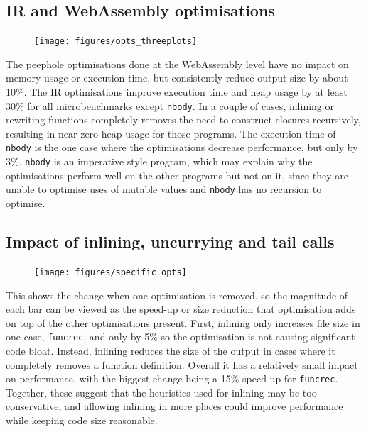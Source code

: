 \subsection{IR and WebAssembly optimisations}

\begin{figure}[H]
\hspace{-1cm}\vspace{-0.6cm}
\texttt{[image: figures/opts\_threeplots]}
 \label{fig:opts} 
\end{figure}

The peephole optimisations done at the WebAssembly level have no impact on memory usage or execution time, but consistently reduce output size by about 10\%. The IR optimisations improve execution time and heap usage by at least 30\% for all microbenchmarks except \verb|nbody|. In a couple of cases, inlining or rewriting functions completely removes the need to construct closures recursively, resulting in near zero heap usage for those programs. The execution time of \verb|nbody| is the one case where the optimisations decrease performance, but only by 3\%.  \verb|nbody| is an imperative style program, which may explain why the optimisations perform well on the other programs but not on it, since they are unable to optimise uses of mutable values and \verb|nbody| has no recursion to optimise.

\subsection{Impact of inlining, uncurrying and tail calls}

\begin{figure}[H]
\hspace{-2cm}
\texttt{[image: figures/specific\_opts]}
 \label{fig:specific-opts} 
\end{figure}

This shows the change when one optimisation is removed, so the magnitude of each bar can be viewed as the speed-up or size reduction that optimisation adds on top of the other optimisations present. First, inlining only increases file size in one case, \verb|funcrec|, and only by 5\% so the optimisation is not causing significant code bloat. Instead, inlining reduces the size of the output in cases where it completely removes a function definition. Overall it has a relatively small impact on performance, with the biggest change being a 15\% speed-up for \verb|funcrec|. Together, these suggest that the heuristics used for inlining may be too conservative, and allowing inlining in more places could improve performance while keeping code size reasonable. %

